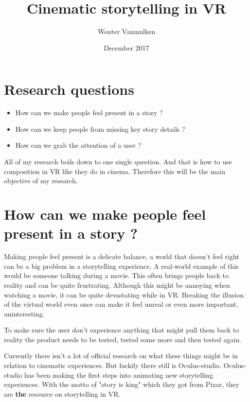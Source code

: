 \documentclass{report}
\title{Cinematic storytelling in VR}
\author{Wouter Vanmulken}
\date{December 2017}
\begin{document}
				\maketitle
				\tableofcontents
				\newpage
		
				
				\chapter{Research questions}
		
				\begin{itemize}
					\item How can we make people feel present in a story ?
					\item How can we keep people from missing key story details ?
					\item How can we grab the attention of a user ?
				\end{itemize}
				\begin{par}
					All of my research boils down to one single question. And that is how to use composition in VR like they do in cinema. Therefore this will be the main objective of my research.
				\end{par}

			

				\chapter{How can we make people feel present in a story ?}
								
				Making people feel present is a delicate balance, a world that doesn't feel right can be a big problem in a storytelling experience. A real-world example of this would be someone talking during a movie. This often brings people back to reality and can be quite frustrating. Although this might be annoying when watching a movie, it can be quite devastating while in VR. Breaking the illusion of the virtual world even once can make it feel unreal or even more important, uninteresting.

				 To make sure the user don't experience anything that might pull them back to reality the product needs to be tested, tested some more and then tested again.
				
				Currently there isn't a lot of official research on what these things might be in relation to cinematic experiences. But luckily there still is Oculus-studio. Oculus-studio has been making the first steps into animating new storytelling experiences. With the motto of "story is king" which they got from Pixar, they are \textbf{the} resource on storytelling in VR. 
				
\end{document}
